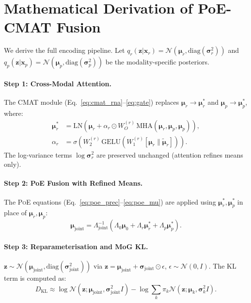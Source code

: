 \documentclass[11pt,a4paper]{article}
\newcommand{\poe}{\textsc{PoE}}
\newcommand{\bx}{\mathbf{x}}
\newcommand{\bz}{\mathbf{z}}
\newcommand{\bmu}{\boldsymbol{\mu}}
\newcommand{\bsig}{\boldsymbol{\sigma}}
\begin{document}
\section{Mathematical Derivation of PoE-CMAT Fusion}\label{app:poe_cmat}

We derive the full encoding pipeline.
Let $q_r(\bz|\bx_r)=\mathcal{N}(\bmu_r, \text{diag}(\bsig_r^2))$ and $q_p(\bz|\bx_p)=\mathcal{N}(\bmu_p, \text{diag}(\bsig_p^2))$ be the modality-specific posteriors.

\paragraph{Step 1: Cross-Modal Attention.}
The CMAT module (Eq.~\ref{eq:cmat_rna}--\ref{eq:gate}) replaces $\bmu_r \to \bmu_r^*$ and $\bmu_p \to \bmu_p^*$, where:
\begin{align}
  \bmu_r^* &= \text{LN}(\bmu_r + \alpha_r \odot W_O^{(r)}\,\text{MHA}(\bmu_r, \bmu_p, \bmu_p)), \\
  \alpha_r &= \sigma(W_2^{(r)}\,\text{GELU}(W_1^{(r)}[\bmu_r \| \tilde{\bmu}_r])).
\end{align}
The log-variance terms $\log\bsig_r^2$ are preserved unchanged (attention refines means only).

\paragraph{Step 2: PoE Fusion with Refined Means.}
The \poe{} equations (Eq.~\ref{eq:poe_prec}--\ref{eq:poe_mu}) are applied using $\bmu_r^*, \bmu_p^*$ in place of $\bmu_r, \bmu_p$:
\begin{equation}
  \bmu_\text{joint} = \Lambda_\text{joint}^{-1}(\Lambda_0\bmu_0 + \Lambda_r\bmu_r^* + \Lambda_p\bmu_p^*).
\end{equation}

\paragraph{Step 3: Reparameterisation and  MoG KL.}
$\bz \sim \mathcal{N}(\bmu_\text{joint}, \text{diag}(\bsig_\text{joint}^2))$ via $\bz = \bmu_\text{joint} + \bsig_\text{joint} \odot \epsilon$, $\epsilon \sim \mathcal{N}(0,I)$.
The KL term is computed as:
\begin{equation}
  D_\text{KL} \approx \log\mathcal{N}(\bz;\bmu_\text{joint}, \bsig_\text{joint}^2 I) - \log\sum_k \pi_k\mathcal{N}(\bz; \bmu_k, \bsig_k^2 I).
\end{equation}
\end{document}
